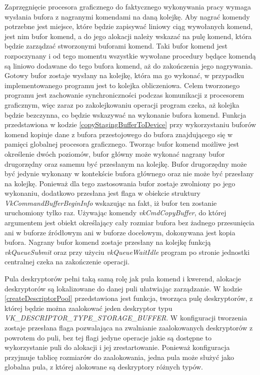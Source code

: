 Zaprzęgnięcie procesora graficznego do faktycznego wykonywania pracy wymaga wysłania bufora z nagranymi komendami na daną kolejkę.
Aby nagrać komendy potrzebne jest miejsce, które będzie zapisywać liniowy ciąg wywołanych komend, jest nim bufor komend, a do jego alokacji należy wskazać na pulę komend, która będzie zarządzać stworzonymi buforami komend.
Taki bufor komend jest rozpoczynany i od tego momentu wszystkie wywołane procedury będące komendą są liniowo dodawane do tego bufora komend, aż do zakończenia jego nagrywania.
Gotowy bufor zostaje wysłany na kolejkę, która ma go wykonać, w przypadku implementowanego programu jest to kolejka obliczeniowa.
Celem tworzonego programu jest zachowanie synchroniczności podczas komunikacji z procesorem graficznym, więc zaraz po zakolejkowaniu operacji program czeka, aż kolejka będzie bezczynna, co będzie wskazywać na wykonanie bufora komend.
Funkcja przedstawiona w kodzie \ref{copyStagingBufferToDevice} przy wykorzystaniu buforów komend kopiuje dane z bufora przestojowego do bufora znajdującego się w pamięci globalnej procesora graficznego.
Tworząc bufor komend możliwe jest określenie dwóch poziomów, bufor główny może wykonać nagrany bufor drugorzędny oraz samemu być przesłanym na kolejkę. Bufor drugorzędny może być jedynie wykonany w kontekście bufora głównego oraz nie może być przesłany na kolejkę.
Ponieważ dla tego zastosowania bufor zostaje zwolniony po jego wykonaniu, dodatkowo przesłana jest flaga w obiekcie struktury \textit{VkCommandBufferBeginInfo} wskazując na fakt, iż bufor ten zostanie uruchomiony tylko raz.
Używając komendy \textit{vkCmdCopyBuffer}, do której argumentem jest obiekt określający cały rozmiar bufora bez żadnego przesunięcia ani w buforze źródłowym ani w buforze docelowym, dokonywana jest kopia bufora.
Nagrany bufor komend zostaje przesłany na kolejkę funkcją \textit{vkQueueSubmit} oraz przy użyciu \textit{vkQueueWaitIdle} program po stronie jednostki centralnej czeka na zakończenie operacji.

\pagebreak

Pula deskryptorów pełni taką samą rolę jak pula komend i kwerend, alokacje deskryptorów są lokalizowane do danej puli ułatwiając zarządzanie.
W kodzie \ref{createDescriptorPool} przedstawiona jest funkcja, tworząca pulę deskryptorów, z której będzie można zaalokować jeden deskryptor typu \textit{VK\_DESCRIPTOR\_TYPE\_STORAGE\_BUFFER}.
W konfiguracji tworzenia zostaje przesłana flaga pozwalająca na zwalnianie zaalokowanych deskryptorów z powrotem do puli, bez tej flagi jedyne operacje jakie są dostępne to wykorzystanie puli do alokacji i jej zrestartowanie.
Ponieważ konfiguracja przyjmuje tablicę rozmiarów do zaalokowania, jedna pula może służyć jako globalna pula, z której alokowane są deskryptory różnych typów.

